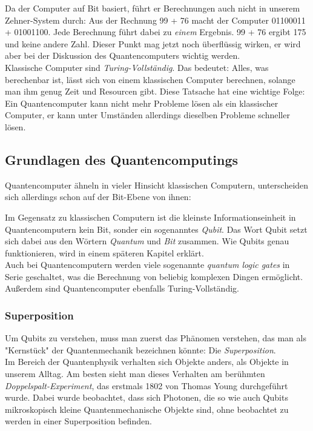 \documentclass[12pt]{article}
\begin{document}
Da der Computer auf Bit basiert, führt er Berechnungen auch nicht in unserem Zehner-System durch: Aus der Rechnung 99 + 76 macht der Computer 01100011 + 01001100. Jede Berechnung führt dabei zu \textit{einem} Ergebnis. 99 + 76 ergibt 175 und keine andere Zahl. Dieser Punkt mag jetzt noch überflüssig wirken, er wird aber bei der Diskussion des Quantencomputers wichtig werden. \\

Klassische Computer sind \textit{Turing-Vollständig}. Das bedeutet: Alles, was berechenbar ist, lässt sich von einem klassischen Computer berechnen, solange man ihm genug Zeit und Resourcen gibt. \cite{TuringWiki} Diese Tatsache hat eine wichtige Folge: \\
Ein Quantencomputer kann nicht mehr Probleme lösen als ein klassischer Computer, er kann unter Umständen allerdings dieselben Probleme schneller lösen.

\subsection{Grundlagen des Quantencomputings}

Quantencomputer ähneln in vieler Hinsicht klassischen Computern, unterscheiden sich allerdings schon auf der Bit-Ebene von ihnen:

Im Gegensatz zu klassischen Computern ist die kleinste Informationseinheit in Quantencomputern kein Bit, sonder ein sogenanntes \textit{Qubit}. Das Wort Qubit setzt sich dabei aus den Wörtern \textit{Quantum} und \textit{Bit} zusammen. \cite{quantum1998} Wie Qubits genau funktionieren, wird in einem späteren Kapitel erklärt. \\

Auch bei Quantencomputern werden viele sogenannte \textit{quantum logic gates} in Serie geschaltet, was die Berechnung von beliebig komplexen Dingen ermöglicht. Außerdem sind Quantencomputer ebenfalls Turing-Vollständig. \cite{quantum1998}

\subsubsection{Superposition}

Um Qubits zu verstehen, muss man zuerst das Phänomen verstehen, das man als "Kernstück" der Quantenmechanik bezeichnen könnte: Die \textit{Superposition}.\\

Im Bereich der Quantenphysik verhalten sich Objekte anders, als Objekte in unserem Alltag. Am besten sieht man dieses Verhalten am berühmten \textit{Doppelspalt-Experiment}, das erstmals 1802 von Thomas Young durchgeführt wurde. Dabei wurde beobachtet, dass sich Photonen, die so wie auch Qubits mikroskopisch kleine Quantenmechanische Objekte sind, ohne beobachtet zu werden in einer Superposition befinden. \cite{Lemmer2017} \\
\end{document}
